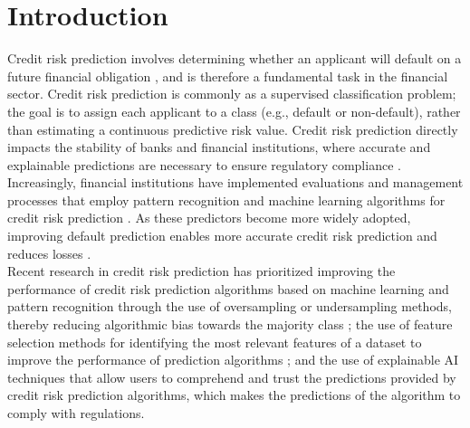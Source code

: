 \section{Introduction}\label{sec:introduction}
    Credit risk prediction involves determining whether an applicant will default on a future financial obligation \cite{zhu2025hybrid}, and is therefore a fundamental task in the financial sector. %
    {\color{blue}Credit risk prediction is commonly as a supervised classification problem; the goal is to assign each applicant to a class (e.g., default or non-default), rather than estimating a continuous predictive risk value. Credit risk prediction directly impacts the stability of banks and financial institutions, where accurate and explainable predictions are necessary to ensure regulatory compliance \cite{zhao2024improved, nguyen2025comparative}.} Increasingly, financial institutions have implemented evaluations and management processes that employ pattern recognition and machine learning algorithms for credit risk prediction \cite{weber2024applications, yeo2025comprehensive}. As these predictors become more widely adopted, improving default prediction enables more accurate credit risk prediction and reduces losses \cite{lu2025llm, hartomo2025novel, yu2025hybrid}.\\

    Recent research in credit risk prediction has prioritized improving the performance of credit risk prediction algorithms based on machine learning and pattern recognition through the use of oversampling or undersampling methods, thereby reducing algorithmic bias towards the majority class \cite{adiputra2025effectiveness, ali2025explainable, kandi2025enhancing, darwish2025intelligent, hu2025combining}; the use of feature selection methods for identifying the most relevant features of a dataset to improve the performance of prediction algorithms \cite{zhu2025hybrid, gasmi2025features, zou2025variable, wang2024feature}; and the use of explainable AI techniques \cite{ali2025explainable, lin2025credit, zhang2025method, han2024nate} that allow users to comprehend and trust the predictions provided by credit risk prediction algorithms, which makes the predictions of the algorithm to comply with regulations.\\
        

